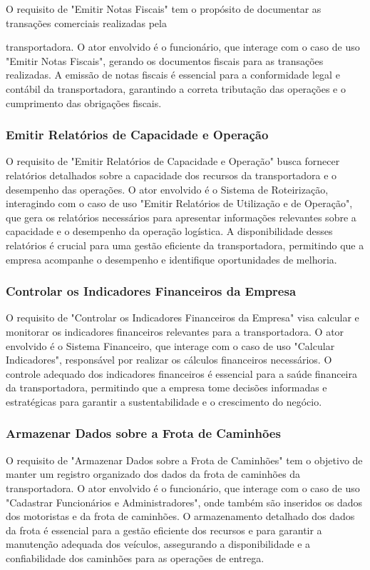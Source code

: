O requisito de "Emitir Notas Fiscais" tem o propósito de documentar as transações comerciais realizadas pela

 transportadora. O ator envolvido é o funcionário, que interage com o caso de uso "Emitir Notas Fiscais", gerando os documentos fiscais para as transações realizadas. A emissão de notas fiscais é essencial para a conformidade legal e contábil da transportadora, garantindo a correta tributação das operações e o cumprimento das obrigações fiscais.

\subsubsection{Emitir Relatórios de Capacidade e Operação}

O requisito de "Emitir Relatórios de Capacidade e Operação" busca fornecer relatórios detalhados sobre a capacidade dos recursos da transportadora e o desempenho das operações. O ator envolvido é o Sistema de Roteirização, interagindo com o caso de uso "Emitir Relatórios de Utilização e de Operação", que gera os relatórios necessários para apresentar informações relevantes sobre a capacidade e o desempenho da operação logística. A disponibilidade desses relatórios é crucial para uma gestão eficiente da transportadora, permitindo que a empresa acompanhe o desempenho e identifique oportunidades de melhoria.

\subsubsection{Controlar os Indicadores Financeiros da Empresa}

O requisito de "Controlar os Indicadores Financeiros da Empresa" visa calcular e monitorar os indicadores financeiros relevantes para a transportadora. O ator envolvido é o Sistema Financeiro, que interage com o caso de uso "Calcular Indicadores", responsável por realizar os cálculos financeiros necessários. O controle adequado dos indicadores financeiros é essencial para a saúde financeira da transportadora, permitindo que a empresa tome decisões informadas e estratégicas para garantir a sustentabilidade e o crescimento do negócio.

\subsubsection{Armazenar Dados sobre a Frota de Caminhões}

O requisito de "Armazenar Dados sobre a Frota de Caminhões" tem o objetivo de manter um registro organizado dos dados da frota de caminhões da transportadora. O ator envolvido é o funcionário, que interage com o caso de uso "Cadastrar Funcionários e Administradores", onde também são inseridos os dados dos motoristas e da frota de caminhões. O armazenamento detalhado dos dados da frota é essencial para a gestão eficiente dos recursos e para garantir a manutenção adequada dos veículos, assegurando a disponibilidade e a confiabilidade dos caminhões para as operações de entrega.

